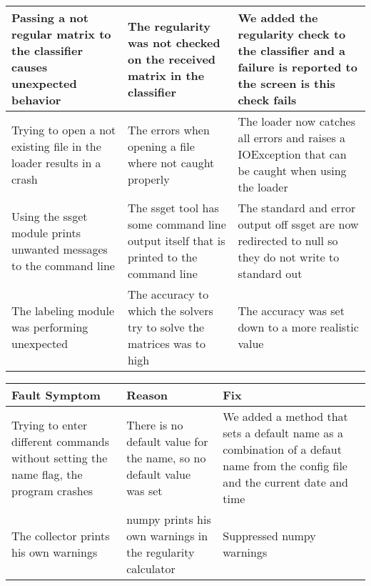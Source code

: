 \documentclass[parskip=full]{scrartcl}
\begin{document}
\begin{tabular}{|p{4.5cm}|p{4.5cm}|p{4.5cm}|}
\hline

Passing a not regular matrix to the classifier causes unexpected behavior &
The regularity was not checked on the received matrix in the classifier &
We added the regularity check to the classifier and a failure is reported to the screen is this check fails \\

\hline

Trying to open a not existing file in the loader results in a crash &
The errors when opening a file where not caught properly &
The loader now catches all errors and raises a IOException that can be caught when using the loader \\

\hline

Using the \gls{ssget} module prints unwanted messages to the command line &
The \gls{ssget} tool has some command line output itself that is printed to the command line &
The standard and error output off \gls{ssget} are now redirected to null so they do not write to standard out \\

\hline

The labeling module was performing unexpected &
The accuracy to which the solvers try to solve the matrices was to high &
The accuracy was set down to a more realistic value \\

\hline

\end{tabular}

\begin{tabular}{|p{4.5cm}|p{4.5cm}|p{4.5cm}|}

\hline

 Fault Symptom  & Reason & Fix  \\

\hline

Trying to enter different commands without setting the name flag, the program crashes &
There is no default value for the name, so no default value was set &
We added a method that sets a default name as a combination of a defaut name from the config file and the current date and time \\

\hline

The collector prints his own warnings &
numpy prints his own warnings in the regularity calculator &
Suppressed numpy warnings \\

\hline

\end{tabular}
\end{document}
